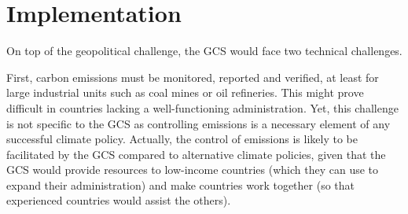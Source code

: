 \documentclass[12pt,english]{article}
\begin{document}
%         

\section{Implementation}\label{sec:implementation}

On top of the geopolitical challenge, %
the GCS would face two technical challenges. 

First, carbon emissions must be monitored, reported and verified, at least for large industrial units such as coal mines or oil refineries. This might prove difficult in countries lacking a well-functioning administration. Yet, this challenge is not specific to the GCS as controlling emissions is a necessary element of any successful climate policy. Actually, the control of emissions is likely to be facilitated by the GCS compared to alternative climate policies, given that the GCS would provide resources to low-income countries (which they can use to expand their administration) and make countries work together (so that experienced countries would assist the others). 
\end{document}
